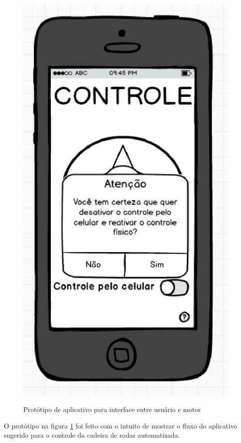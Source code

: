 \begin{figure}[!htb]
{  		\includegraphics[keepaspectratio=true,scale=0.6]{figuras/controle/tela_4}
		}
		\caption{Protótipo de aplicativo para interface entre usuário e motor}
		\label{fig:prototipos}
  \end{figure}

O protótipo na figura \ref{fig:prototipos} foi feito com o intuito de mostrar o fluxo do aplicativo sugerido para o controle da cadeira de rodas automatizada.

